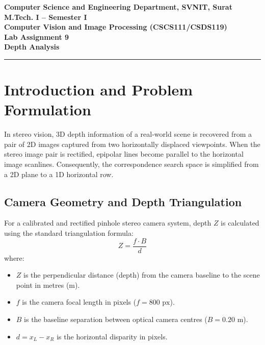 \documentclass[12pt]{article}
\begin{document}

\begin{center}
\textbf{Computer Science and Engineering Department, SVNIT, Surat}\\
\textbf{M.Tech. I -- Semester I}\\
\textbf{Computer Vision and Image Processing (CSCS111/CSDS119)}\\
\textbf{Lab Assignment 9}\\
\textbf{Depth Analysis}
\end{center}
\vspace{-4pt}
\hrule
\vspace{6pt}

\section{Introduction and Problem Formulation}

In stereo vision, 3D depth information of a real-world scene is recovered from a pair of 2D images captured from two horizontally displaced viewpoints. When the stereo image pair is rectified, epipolar lines become parallel to the horizontal image scanlines. Consequently, the correspondence search space is simplified from a 2D plane to a 1D horizontal row.

\subsection{Camera Geometry and Depth Triangulation}
For a calibrated and rectified pinhole stereo camera system, depth $Z$ is calculated using the standard triangulation formula:
\begin{equation}
Z = \frac{f \cdot B}{d}
\end{equation}
where:
\begin{itemize}
    \item $Z$ is the perpendicular distance (depth) from the camera baseline to the scene point in metres ($\text{m}$).
    \item $f$ is the camera focal length in pixels ($f = 800\text{ px}$).
    \item $B$ is the baseline separation between optical camera centres ($B = 0.20\text{ m}$).
    \item $d = x_L - x_R$ is the horizontal disparity in pixels.
\end{itemize}
\end{document}
